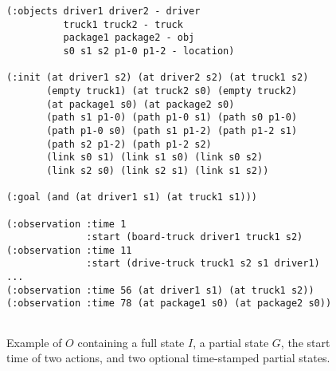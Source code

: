 \documentclass{ecai}
\begin{document}
\begin{figure}%
	\begin{scriptsize}    
		\begin{verbatim}
(:objects driver1 driver2 - driver
          truck1 truck2 - truck
          package1 package2 - obj
          s0 s1 s2 p1-0 p1-2 - location)
		
(:init (at driver1 s2) (at driver2 s2) (at truck1 s2)
       (empty truck1) (at truck2 s0) (empty truck2) 
       (at package1 s0) (at package2 s0)
       (path s1 p1-0) (path p1-0 s1) (path s0 p1-0) 
       (path p1-0 s0) (path s1 p1-2) (path p1-2 s1)
       (path s2 p1-2) (path p1-2 s2)
       (link s0 s1) (link s1 s0) (link s0 s2) 
       (link s2 s0) (link s2 s1) (link s1 s2))
		
(:goal (and (at driver1 s1) (at truck1 s1)))
		
(:observation :time 1 
              :start (board-truck driver1 truck1 s2)
(:observation :time 11 
              :start (drive-truck truck1 s2 s1 driver1)
...
(:observation :time 56 (at driver1 s1) (at truck1 s2))
(:observation :time 78 (at package1 s0) (at package2 s0))
	
	\end{verbatim}
	\end{scriptsize}    
	\caption{Example of $O$ containing a full state $I$, a partial state $G$, the start time of two actions, and two optional time-stamped partial states.}
	\label{fig:exampleObservations}
\end{figure}
\end{document}
